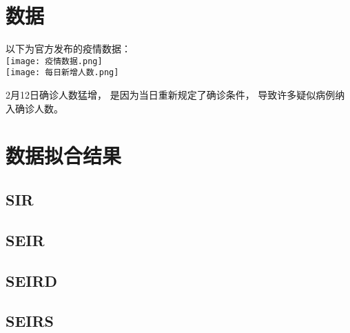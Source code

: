 \begin{appendix}
    \section{数据\label{appendix:数据}}
    以下为官方发布的疫情数据：
    \\
    \texttt{[image: 疫情数据.png]}
    \\
    \texttt{[image: 每日新增人数.png]}
    \par
    2月12日确诊人数猛增，
    是因为当日重新规定了确诊条件，
    导致许多疑似病例纳入确诊人数。
    \section{数据拟合结果\label{appendix:数据拟合结果}}
    \subsection{SIR}
    \subsection{SEIR}
    \subsection{SEIRD}
    \subsection{SEIRS}
\end{appendix}